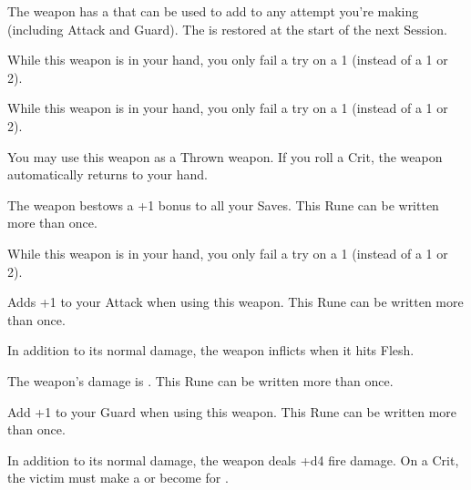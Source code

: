 \begin{multicols*}{2}






The weapon has a  that can be used to add to any \RO attempt you're making (including Attack and Guard).  The \UD is restored at the start of the next Session.


While this weapon is in your hand, you only fail a \INJURY try on a 1 (instead of a 1 or 2).


While this weapon is in your hand, you only fail a \DEATH try on a 1 (instead of a 1 or 2).


You may use this weapon as a Thrown weapon. If you roll a Crit, the weapon automatically returns to your hand.


The weapon bestows a +1 bonus to all your Saves.  This Rune can be written more than once.

\cbreak


While this weapon is in your hand, you only fail a \INSANITY try on a 1 (instead of a 1 or 2).





Adds +1 to your Attack \RO when using this weapon.  This Rune can be written more than once.


In addition to its normal damage, the weapon inflicts  when it hits Flesh.


The weapon's damage is \DCUP.  This Rune can be written more than once.


Add +1 to your Guard \RO when using this weapon.  This Rune can be written more than once.


In addition to its normal damage, the weapon deals +d4 fire damage.  On a Crit, the victim must make a  or become  for .


\end{multicols*}
